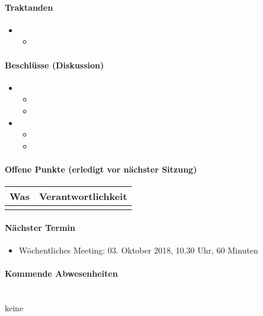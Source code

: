\paragraph{Traktanden}
\begin{itemize}	
	\item 
	\begin{itemize}
		\item 
	\end{itemize}
	
\end{itemize}

\paragraph{Beschlüsse (Diskussion)}
\begin{itemize}	
	\item 
	\begin{itemize}
		\item 
		\item 
	\end{itemize}
	\item 
	\begin{itemize}
		\item 
		\item 
	\end{itemize} 
\end{itemize}

\paragraph{Offene Punkte (erledigt vor nächster Sitzung)} \mbox{}
\begin{table}[H]
	\centering
	\begin{tabularx}{\textwidth}{X | p{4.5cm}}
		\rowcolor{gray!50}
		\textbf{Was} & \textbf{Verantwortlichkeit} \\
		\hline	
		&  \\
	\end{tabularx}
	\label{tab:my-label}
\end{table}

\paragraph{Nächster Termin}
\begin{itemize}	
	\item Wöchentliches Meeting: 03. Oktober 2018, 10.30 Uhr, 60 Minuten
\end{itemize}

\paragraph{Kommende Abwesenheiten} \mbox{}\\
keine